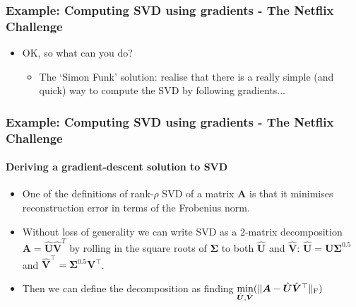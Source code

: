 \documentclass[\beamerclass]{beamer}
\begin{document}
\begin{frame}
\frametitle{Example: Computing SVD using gradients - The Netflix Challenge}
\begin{itemize}
	\item<+-> OK, so what can you do?
	\begin{itemize}
		\item<+-> The `Simon Funk' solution: realise that there is a really simple (and quick) way to compute the SVD by following gradients...
	\end{itemize}
\end{itemize}
\end{frame}

\begin{frame}
\frametitle{Example: Computing SVD using gradients - The Netflix Challenge}
\framesubtitle{Deriving a gradient-descent solution to SVD}
\begin{itemize}
	\item<+-> One of the definitions of rank-$\rho$ SVD of a matrix $\bm A$ is that it minimises reconstruction error in terms of the Frobenius norm.
	\item<+-> Without loss of generality we can write SVD as a 2-matrix decomposition $\bm A = \hat{\bm U} \hat{\bm V}^T$ by rolling in the square roots of $\bm\Sigma$ to both $\hat{\bm U}$ and $\hat{\bm V}$: $\hat{\bm U} = \bm U \bm\Sigma^{0.5}$ and $\hat{\bm V}^\top = \bm \Sigma^{0.5} \bm V^\top$.
	\item<+-> Then we can define the decomposition as finding $\min\limits_{\hat{\bm U}, \hat{\bm V}}( \| \bm A - \hat{\bm U}\hat{\bm V}^\top \|_{\rm F} )$
\end{itemize}
\end{frame}
\end{document}
